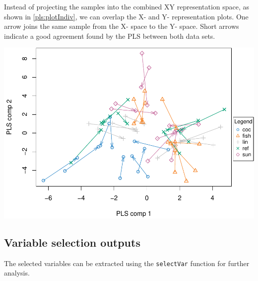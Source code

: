 \documentclass[]{book}
\newenvironment{Shaded}{\begin{snugshade}}{\end{snugshade}}
\newcommand{\CommentTok}[1]{\textcolor[rgb]{0.56,0.35,0.01}{\textit{#1}}}
\newcommand{\DataTypeTok}[1]{\textcolor[rgb]{0.13,0.29,0.53}{#1}}
\newcommand{\DecValTok}[1]{\textcolor[rgb]{0.00,0.00,0.81}{#1}}
\newcommand{\KeywordTok}[1]{\textcolor[rgb]{0.13,0.29,0.53}{\textbf{#1}}}
\newcommand{\NormalTok}[1]{#1}
\newcommand{\OperatorTok}[1]{\textcolor[rgb]{0.81,0.36,0.00}{\textbf{#1}}}
\newcommand{\OtherTok}[1]{\textcolor[rgb]{0.56,0.35,0.01}{#1}}
\newcommand{\StringTok}[1]{\textcolor[rgb]{0.31,0.60,0.02}{#1}}
\begin{document}
Instead of projecting the samples into the combined XY representation space, as shown in \ref{pls:plotIndiv}, we can overlap the X- and Y- representation plots. One arrow joins the same sample from the X- space to the Y- space. Short arrows indicate a good agreement found by the PLS between both data sets.

\begin{Shaded}
\end{Shaded}

\begin{center}\includegraphics[width=0.5\linewidth,]{Figures/05-pls-plotArrow-1} \end{center}

\hypertarget{variable-selection-outputs-1}{%
\subsection{Variable selection outputs}\label{variable-selection-outputs-1}}

The selected variables can be extracted using the \texttt{selectVar} function for further analysis.

\begin{Shaded}
\end{Shaded}
\end{document}
